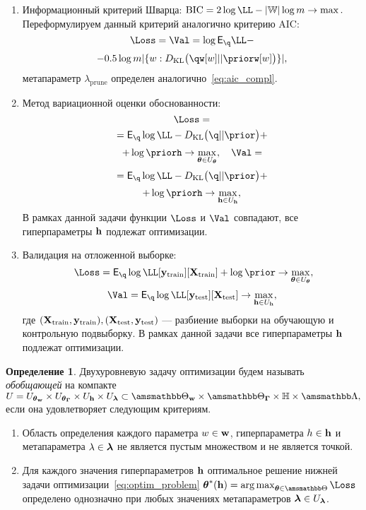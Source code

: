 \documentclass[11pt, a5paper]{dissert}
\theoremstyle{definition}
\newtheorem{defin}{Определение}
\DeclareMathOperator*{\argmax}{arg\,max}
\begin{document}
{\begin{enumerate}
\item Информационный критерий Шварца:
$
    \text{BIC} = 2\log \LL - |\Wb| \log m   \to \max.
$
Переформулируем данный критерий аналогично критерию AIC:
\begin{equation}
\label{eq:optim_bic}
    \Loss = \Val = \log \E_{\q}\LL - 
\end{equation}
\[
 - 0.5 \log m |\{w: \KL{\qw[w]}{\priorw[w]}\}|,
\]
метапараметр $\lambda_{\text{prune}}$ определен аналогично~\eqref{eq:aic_compl}.

\item Метод вариационной оценки обоснованности:
\begin{equation}
\label{eq:optim_elbo_method}   
    \Loss = 
\end{equation}
\[
= \E_{\q} \log \LL - \KL{\q}{\prior} + 
\]
\[
+\log\priorh \to \max_{\teta \in \Uteta}, \quad    \Val = 
\]
\[
= \E_{\q} \log \LL - \KL{\q}{\prior} +
\]
\[+ \log\priorh \to \max_{\h \in \Uh},
\]
В рамках данной задачи функции $\Loss$ и $\Val$ совпадают, все гиперпараметры $\mathbf{h}$ подлежат оптимизации.

\item Валидация на отложенной выборке:
\begin{equation}
\label{eq:optim_hold_out}
    \Loss = \E_{\q} \log \LL[\y_\text{train}][\X_\text{train}] + \log \prior \to \max_{\teta \in \Uteta},
\end{equation}
\[
    \Val = \E_{\q} \log \LL[\y_\text{test}][\X_\text{test}] \to \max_{\h \in \Uh},
\]
где $(\mathbf{X}_\text{train}, \mathbf{y}_\text{train}), (\mathbf{X}_\text{test}, \mathbf{y}_\text{test})$ --- разбиение выборки на обучающую и контрольную подвыборку.
В рамках данной задачи все гиперпараметры $\mathbf{h}$ подлежат оптимизации.

\end{enumerate}

\begin{defin}
Двухуровневую задачу оптимизации будем называть \textit{обобщающей} на компакте $U = \Utetaw \times \UtetaG \times \Uh \times \Ulam \subset \Tetawb \times \TetaGb \times \Hb \times \Lamb,$ если она удовлетворяет следующим критериям.
\begin{enumerate}
\item Область определения каждого параметра $w \in \mathbf{w}$, гиперпараметра $h \in \mathbf{h}$ и метапараметра $\lambda \in \boldsymbol{\lambda}$ не  является пустым множеством и не является точкой.
\item Для каждого значения гиперпараметров $\mathbf{h}$ оптимальное решение нижней задачи оптимизации~\eqref{eq:optim_problem} 
$
\teta^{*}(\h) = \argmax_{\teta \in \Tetab} \Loss
$
определено однозначно при любых значениях метапараметров $\boldsymbol{\lambda} \in U_{\boldsymbol{\lambda}}$.


\end{enumerate}
\end{defin}}
\end{document}
